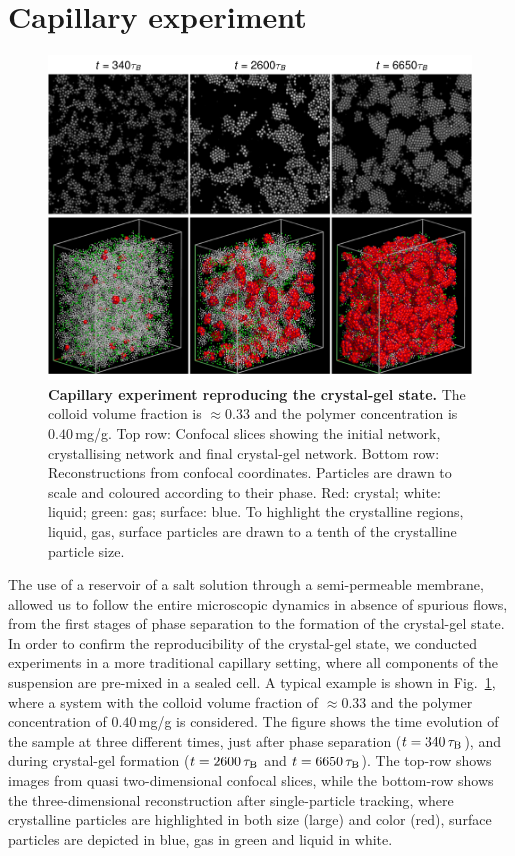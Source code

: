 \section*{Capillary experiment}

\begin{figure}[!t]
\includegraphics{capillary.pdf}
\caption{\textbf{Capillary experiment reproducing the crystal-gel state.} The colloid volume fraction is $\approx 0.33$ and the polymer concentration is $0.40\,$mg/g. Top row: Confocal slices showing the initial network, crystallising network and final crystal-gel network. Bottom row: Reconstructions from confocal coordinates. Particles are drawn to scale and coloured according to their phase. Red: crystal; white: liquid; green: gas; surface: blue. To highlight the crystalline regions, liquid, gas, surface particles are drawn to a tenth of the crystalline particle size.}
\label{fig:capillary}
\end{figure}


The use of a reservoir of a salt solution through a semi-permeable membrane, allowed us to follow the entire microscopic dynamics in absence of spurious flows, from the first stages of phase separation to the formation of the crystal-gel state. In order to confirm the reproducibility of the crystal-gel state, we conducted experiments in a more traditional capillary setting, where all components of the suspension are pre-mixed in a sealed cell. A typical example is
shown in Fig.~\ref{fig:capillary}, where a system with the colloid volume fraction of $\approx 0.33$ and the polymer concentration of $0.40\,$mg/g is considered.
The figure shows the time evolution of the sample at three different times, just after phase separation ($t=340\,\tau_{\rm B}$), and during
crystal-gel formation ($t=2600\,\tau_{\rm B}$ and $t=6650\,\tau_{\rm B}$). The top-row shows images from quasi two-dimensional confocal slices, while the bottom-row shows
the three-dimensional reconstruction after single-particle tracking, where crystalline particles are highlighted in both size (large) and color (red), surface particles
are depicted in blue, gas in green and liquid in white.

